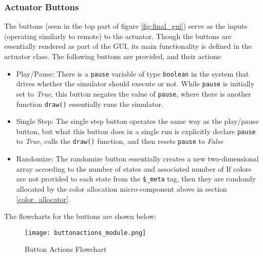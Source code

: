 \subsubsection{Actuator Buttons}
The buttons (seen in the top part of figure \ref{fig:final_gui}) serve as the inputs (operating similarly to remote) to the actuator. Though the buttons are essentially rendered as part of the GUI, its main functionality is defined in the actuator class. The following buttons are provided, and their actions:
\begin{itemize}
    \item Play/Pause: 
    There is a \texttt{pause} variable of type \texttt{boolean} in the system that drives whether the simulator should execute or not. While \texttt{pause} is initially set to \textit{True}, this button negates the value of \texttt{pause}, where there is another function \texttt{draw()} essentially runs the simulator. 
    \item Single Step: 
    The single step button operates the same way as the play/pause button, but what this button does in a single run is explicitly declare \texttt{pause} to \textit{True}, calls the \texttt{draw()} function, and then resets \texttt{pause} to \textit{False}
    \item Randomize:
    The randomize button essentially creates a new two-dimensional array according to the number of states and associated number of If colors are not provided to each state from the \texttt{\$\_meta} tag, then they are randomly allocated by the color allocation micro-component above in section \ref{color_allocator}.
\end{itemize}
The flowcharts for the buttons are shown below:
\\
\begin{figure}[H]
    \caption{Button Actions Flowchart}
    \centering
    \texttt{[image: buttonactions\_module.png]}
\end{figure}

\newpage
